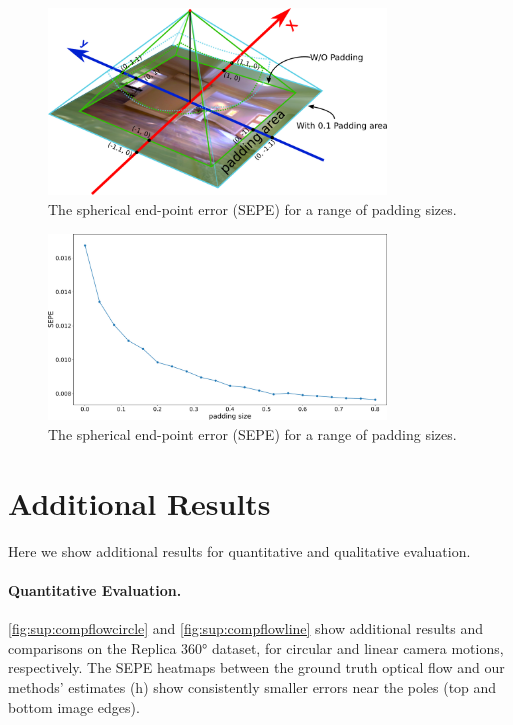 \documentclass{bmvc2k}
\begin{document}
\begin{figure}[hbt!]
	\centering
	\includegraphics[width=0.80\textwidth]{images/tangent_image/tangent_image_padding.pdf}
	\caption{\label{fig:sup:howtopadding}%
		The spherical end-point error (SEPE) for a range of padding sizes.}
\end{figure}

\begin{figure}[hbt!]
	\centering
	\includegraphics[width=0.80\textwidth]{images/abla_padding.pdf}
	\caption{\label{fig:sup:ablationpadding}%
		The spherical end-point error (SEPE) for a range of padding sizes.}
\end{figure}


\section{Additional Results}

Here we show additional results for quantitative and qualitative evaluation.


\paragraph{Quantitative Evaluation.}

\cref{fig:sup:compflowcircle} and \cref{fig:sup:compflowline} show additional results and comparisons on the Replica 360° dataset, for circular and linear camera motions, respectively.
The SEPE heatmaps between the ground truth optical flow and our methods' estimates (h) show consistently smaller errors near the poles (top and bottom image edges).
\end{document}
